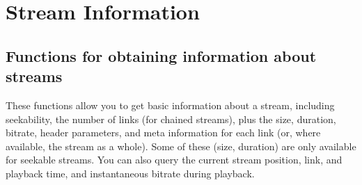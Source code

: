 \hypertarget{group__stream__info}{}\section{Stream Information}
\label{group__stream__info}
\subsection*{Functions for obtaining information about streams}
\label{_amgrp77b9681e34c86cf7994f702bc36a679d}%
These functions allow you to get basic information about a stream, including seekability, the number of links (for chained streams), plus the size, duration, bitrate, header parameters, and meta information for each link (or, where available, the stream as a whole). Some of these (size, duration) are only available for seekable streams. You can also query the current stream position, link, and playback time, and instantaneous bitrate during playback.

